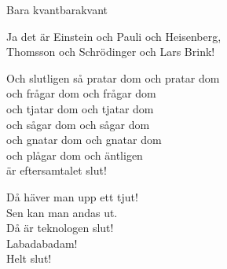 \begin{song}{Bara kvant}{barakvant}
\begin{vers}
    Ja det är Einstein och Pauli och Heisenberg,\\
    Thomsson och Schrödinger och Lars Brink!\\
    \end{vers}
    \begin{vers}
    Och slutligen så pratar dom och pratar dom\\
    och frågar dom och frågar dom\\
    och tjatar dom och tjatar dom\\
    och sågar dom och sågar dom\\
    och gnatar dom och gnatar dom\\
    och plågar dom och äntligen\\
    är eftersamtalet slut!\\
    \end{vers}
    \begin{vers}
    Då häver man upp ett tjut!\\
    Sen kan man andas ut.\\
    Då är teknologen slut!\\
    Labadabadam!\\
    Helt slut!\\
    \end{vers}
    \begin{vers}
    \end{vers}
    \end{song}
    